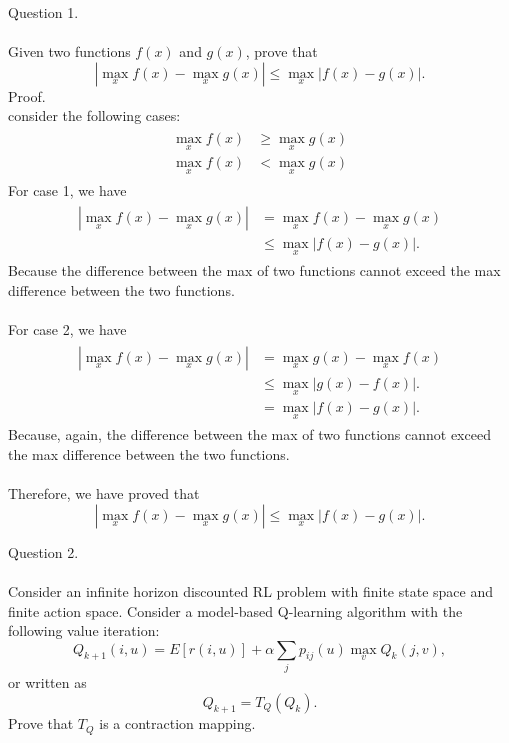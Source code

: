 \documentclass{article}
\begin{document}
Question 1. \\\\
Given two functions $f(x)$ and $g(x)$, prove that
\begin{equation}
    |\max_{x} f(x) - \max_{x} g(x)|  \leq \max_{x} |f(x) - g(x)|.
\end{equation}
Proof. \\
consider the following cases:
\begin{align}
    \begin{split}
        \max_{x} f(x) & \geq \max_{x} g(x) \\
        \max_{x} f(x) & < \max_{x} g(x)
    \end{split}
\end{align}
For case 1, we have
\begin{align}
    \begin{split}
        |\max_{x} f(x) - \max_{x} g(x)| & = \max_{x} f(x) - \max_{x} g(x) \\
        & \leq \max_{x} |f(x) - g(x)|.
    \end{split}
\end{align}
Because the difference between the max of two functions cannot exceed the max difference between the two functions. \\\\
For case 2, we have
\begin{align}
    \begin{split}
        |\max_{x} f(x) - \max_{x} g(x)| & = \max_{x} g(x) - \max_{x} f(x) \\
        & \leq \max_{x} |g(x) - f(x)|. \\
        & = \max_{x} |f(x) - g(x)|.
    \end{split}
\end{align}
Because, again, the difference between the max of two functions cannot exceed the max difference between the two functions. \\\\
Therefore, we have proved that
\begin{equation}
    |\max_{x} f(x) - \max_{x} g(x)|  \leq \max_{x} |f(x) - g(x)|.
\end{equation}
\newpage


Question 2. \\\\

Consider an infinite horizon discounted RL problem with finite state space and finite action space.
Consider a model-based Q-learning algorithm with the following value iteration:
\begin{equation}
Q_{k+1}(i, u) = E [r(i, u)] + \alpha \sum_{j} p_{ij}(u) \max_{v} Q_k(j, v),
\end{equation}
or written as
\begin{equation}
    Q_{k+1} = T_Q(Q_k).
\end{equation}
Prove that $T_Q$ is a contraction mapping. \\\\
\end{document}
